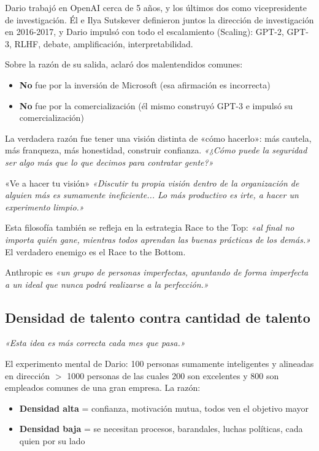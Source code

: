 \documentclass[a4paper]{article}
\begin{document}
Dario trabajó en OpenAI cerca de 5 años, y los últimos dos como vicepresidente de investigación. Él e Ilya Sutskever definieron juntos la dirección de investigación en 2016-2017, y Dario impulsó con todo el escalamiento (Scaling): GPT-2, GPT-3, RLHF, debate, amplificación, interpretabilidad.

Sobre la razón de su salida, aclaró dos malentendidos comunes:
\begin{itemize}
    \item \textbf{No} fue por la inversión de Microsoft (esa afirmación es incorrecta)
    \item \textbf{No} fue por la comercialización (él mismo construyó GPT-3 e impulsó su comercialización)
\end{itemize}

La verdadera razón fue tener una visión distinta de «cómo hacerlo»: más cautela, más franqueza, más honestidad, construir confianza. \textit{«¿Cómo puede la seguridad ser algo más que lo que decimos para contratar gente?»}

\begin{importantbox}{«Ve a hacer tu visión»}
\textit{«Discutir tu propia visión dentro de la organización de alguien más es sumamente ineficiente... Lo más productivo es irte, a hacer un experimento limpio.»}

Esta filosofía también se refleja en la estrategia Race to the Top: \textit{«al final no importa quién gane, mientras todos aprendan las buenas prácticas de los demás.»} El verdadero enemigo es el Race to the Bottom.

Anthropic es \textit{«un grupo de personas imperfectas, apuntando de forma imperfecta a un ideal que nunca podrá realizarse a la perfección.»}
\end{importantbox}

\subsection{Densidad de talento contra cantidad de talento}

\textit{«Esta idea es más correcta cada mes que pasa.»}

El experimento mental de Dario: 100 personas sumamente inteligentes y alineadas en dirección $>$ 1000 personas de las cuales 200 son excelentes y 800 son empleados comunes de una gran empresa. La razón:

\begin{itemize}
    \item \textbf{Densidad alta} = confianza, motivación mutua, todos ven el objetivo mayor
    \item \textbf{Densidad baja} = se necesitan procesos, barandales, luchas políticas, cada quien por su lado
\end{itemize}
\end{document}
